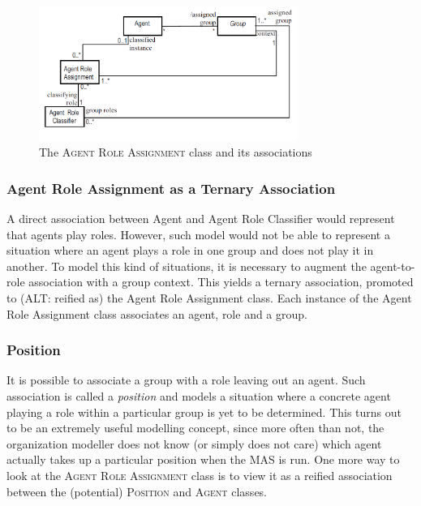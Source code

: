 \begin{figure}[ht]
	\centering
	\includegraphics[width=0.75\textwidth]{images/onp-agent-role-assignment.png}
	\caption{The \textsc{Agent Role Assignment} class and its associations}
	\label{figure:onp-agent-role-assignment}
\end{figure}

\subsubsection*{Agent Role Assignment as a Ternary Association}

A direct association between Agent and Agent Role Classifier would represent that agents play roles.
However, such model would not be able to represent a situation where an agent plays a role in one group and does not play it in another.
To model this kind of situations, it is necessary to augment the agent-to-role association with a group context.
This yields a ternary association, promoted to (ALT: reified as) the Agent Role Assignment class.
Each instance of the Agent Role Assignment class associates an agent, role and a group.

\subsubsection*{Position}

It is possible to associate a group with a role leaving out an agent.
Such association is called a \textit{position} and models a situation where a concrete agent playing a role within a particular group is yet to be determined.
This turns out to be an extremely useful modelling concept, since more often than not, the organization modeller does not know (or simply does not care) which agent actually takes up a particular position when the MAS is run.
One more way to look at the \textsc{Agent Role Assignment} class is to view it as a reified association between the (potential) \textsc{Position} and \textsc{Agent} classes.